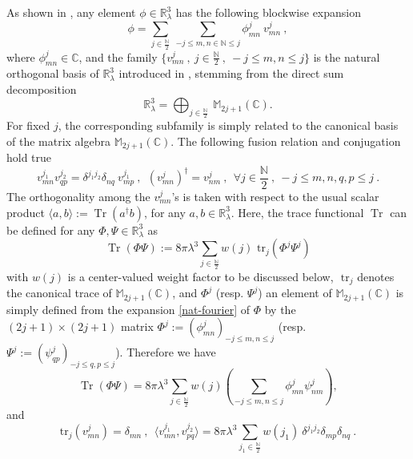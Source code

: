 \documentclass[a4paper,11pt,twoside]{article}
\numberwithin{equation}{section}
\DeclareMathOperator{\tr}{Tr}
\theoremstyle{nonumberplain}
\newcounter{and}
\begin{document}
%
As shown in \cite{vit-wal-12}, any element $\phi\in\mathbb{R}^3_\lambda$ has the following blockwise expansion%
%
\begin{equation}
\phi = \sum_{j\in\frac{\mathbb{N}}{2}} \ \sum_{-j\le m,n\in\mathbb{N}\le j} \phi^j_{mn} \ v^j_{mn} \ , \label{nat-fourier}
\end{equation}
%
where $\phi^j_{mn}\in\mathbb{C}$, and the family $\{v^j_{mn} \ , \ j\in\frac{\mathbb{N}}{2} \ ,\ -j\le m,n\le j\}$ is the natural orthogonal basis of $\mathbb{R}^3_\lambda$ introduced in \cite{vit-wal-12}, stemming from the direct sum decomposition%
%
\begin{equation}
\mathbb{R}^3_\lambda = \bigoplus_{j\in\frac{\mathbb{N}}{2}} \ \mathbb{M}_{2j+1}(\mathbb{C})\label{orthogonal-decomp}. 
\end{equation}
%
For fixed $j$, the corresponding subfamily is simply related to the canonical basis of the matrix algebra $\mathbb{M}_{2j+1}(\mathbb{C})$. The following fusion relation and conjugation hold true%
%
\begin{equation}
v^{j_1}_{mn} v^{j_2}_{qp} = \delta^{j_1j_2} \delta_{nq} \ v^{j_1}_{mp} \ , \ \ (v^j_{mn})^\dag=v^j_{nm} \ , \ \ 
\forall j\in\frac{\mathbb{N}}{2} \ , \ -j\le m,n,q,p\le j \ . \label{fusion}
\end{equation}
%
The orthogonality among the $v^j_{mn}$'s is taken with respect to the usual scalar product $\langle a,b\rangle:=\tr(a^\dag b)$, for any $a,b\in\mathbb{R}^3_\lambda$. Here, the trace functional $\tr$ can be defined \cite{gervitwal-13} for any $\Phi,\Psi\in\mathbb{R}^3_\lambda$ as%
%
\begin{equation}
\tr(\Phi\Psi) := 8 \pi \lambda^3 \sum_{j\in\frac{\mathbb{N}}{2}} w(j) \mbox{ tr}_j(\Phi^j\Psi^j)\label{trace-family}
\end{equation}
%
with $w(j)$ is a center-valued weight factor to be discussed below, $\mbox{ tr}_j$ denotes the canonical trace of $\mathbb{M}_{2j+1}(\mathbb{C})$, and $\Phi^j$ (resp. $\Psi^j$) an element of $\mathbb{M}_{2j+1}(\mathbb{C})$ is simply defined from the expansion \eqref{nat-fourier} of $\Phi$ by the $(2j+1)\times(2j+1)$ matrix $\Phi^j:=(\phi^j_{mn})_{-j\le m,n\le j}$ (resp. $\Psi^j:= (\psi^j_{qp})_{-j\le q,p\le j}$). Therefore we have%
%
\begin{equation}
\tr(\Phi\Psi)  = 8 \pi \lambda^3 \sum_{j\in\frac{\mathbb{N}}{2}} w(j) \left( \sum_{-j\le m,n\le j}\phi^j_{mn}\psi^j_{nm}\right), \label{traceb} 
\end{equation}
%
and%
%
\begin{equation}
\mbox{tr}_j(v^j_{mn}) = \delta_{mn} \ , \ \
\langle v^{j_1}_{mn} , v^{j_2}_{pq} \rangle = 8 \pi \lambda^3 \sum_{j_1\in\frac{\mathbb{N}}{2}} w(j_1) \ \delta^{j_1j_2} \delta_{mp} \delta_{nq} \ . \label{ortho-normaliz}
\end{equation}
\end{document}
